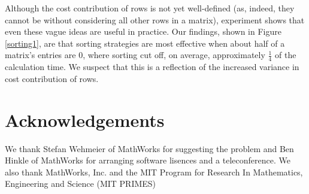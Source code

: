 \documentclass[12pt]{amsart}
\numberwithin{equation}{section}
\numberwithin{figure}{section}
\newcommand{\cc}{cost contribution\xspace}
\begin{document}
Although the \cc of rows is not yet well-defined (as, indeed, they cannot be without considering all other rows in a matrix), experiment shows that even these vague ideas are useful in practice. Our findings, shown in Figure \ref{sorting1}, are that sorting strategies are most effective when about half of a matrix's entries are 0, where sorting cut off, on average, approximately $\frac{1}{4}$ of the calculation time. We suspect that this is a reflection of the increased variance in \cc of rows.




\section*{Acknowledgements}
We thank Stefan Wehmeier of MathWorks for suggesting the problem and Ben Hinkle of MathWorks for arranging software lisences and a teleconference. We also thank MathWorks, Inc. and the MIT Program for Research In Mathematics, Engineering and Science (MIT PRIMES)



\end{document}
